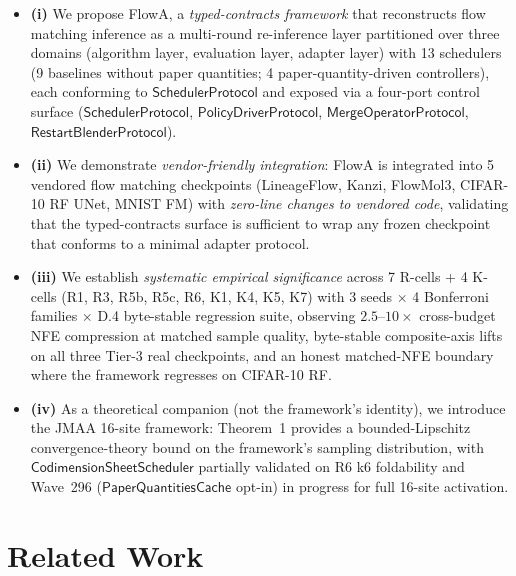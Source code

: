 \documentclass[journal,twocolumn,final]{IEEEtran}
\begin{document}
\begin{itemize}
\item \textbf{(i)} We propose FlowA, a \emph{typed-contracts framework} that
reconstructs flow matching inference as a multi-round re-inference layer
partitioned over three domains (algorithm layer, evaluation layer, adapter
layer) with 13 schedulers (9 baselines without paper quantities; 4
paper-quantity-driven controllers), each conforming to $\mathsf{SchedulerProtocol}$
and exposed via a four-port control surface ($\mathsf{SchedulerProtocol}$,
$\mathsf{PolicyDriverProtocol}$, $\mathsf{MergeOperatorProtocol}$,
$\mathsf{RestartBlenderProtocol}$).

\item \textbf{(ii)} We demonstrate \emph{vendor-friendly integration}: FlowA
is integrated into 5 vendored flow matching checkpoints (LineageFlow, Kanzi,
FlowMol3, CIFAR-10 RF UNet, MNIST FM) with \emph{zero-line changes to
vendored code}, validating that the typed-contracts surface is sufficient to
wrap any frozen checkpoint that conforms to a minimal adapter protocol.

\item \textbf{(iii)} We establish \emph{systematic empirical significance}
across 7 R-cells + 4 K-cells (R1, R3, R5b, R5c, R6, K1, K4, K5, K7) with 3
seeds $\times$ 4 Bonferroni families $\times$ D.4 byte-stable regression
suite, observing $2.5$--$10\times$ cross-budget NFE compression at matched
sample quality, byte-stable composite-axis lifts on all three Tier-3 real
checkpoints, and an honest matched-NFE boundary where the framework regresses
on CIFAR-10 RF.

\item \textbf{(iv)} As a theoretical companion (not the framework's
identity), we introduce the JMAA 16-site framework: Theorem~1 provides a
bounded-Lipschitz convergence-theory bound on the framework's sampling
distribution, with $\mathsf{CodimensionSheetScheduler}$ partially validated on
R6 k6 foldability and Wave~296 ($\mathsf{PaperQuantitiesCache}$ opt-in) in
progress for full 16-site activation.
\end{itemize}

\section{Related Work}\label{sec:related}
\end{document}

